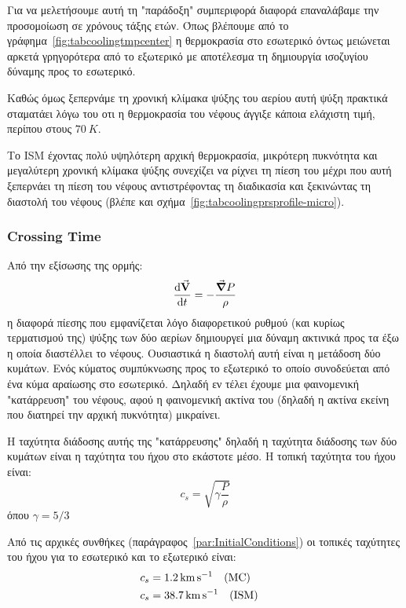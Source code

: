	Για να μελετήσουμε αυτή τη "παράδοξη" συμπεριφορά διαφορά επαναλάβαμε την προσομοίωση σε χρόνους τάξης ετών. Όπως βλέπουμε από το γράφημα~\ref{fig:tabcoolingtmpcenter} η θερμοκρασία στο εσωτερικό όντως μειώνεται αρκετά γρηγορότερα από το εξωτερικό με αποτέλεσμα τη δημιουργία ισοζυγίου δύναμης προς το εσωτερικό.
	
		Καθώς όμως ξεπερνάμε τη χρονική κλίμακα ψύξης του αερίου αυτή ψύξη πρακτικά  σταματάει λόγω του οτι η θερμοκρασία του νέφους άγγιξε κάποια ελάχιστη τιμή, περίπου στους $\SI{70}{K}$. 

 	Το ISM έχοντας πολύ υψηλότερη αρχική θερμοκρασία, μικρότερη πυκνότητα και μεγαλύτερη χρονική κλίμακα ψύξης συνεχίζει να ρίχνει τη πίεση του μέχρι που αυτή ξεπερνάει τη πίεση του νέφους αντιστρέφοντας τη διαδικασία και ξεκινώντας τη διαστολή του νέφους (βλέπε και σχήμα~\ref{fig:tabcoolingprsprofile-micro}).
	

	\subsubsection{Crossing Time}
	\label{par:crossing_time}
%	
	 Από την εξίσωσης της ορμής:
	\begin{equation}
	\dv{\va V}{t}=-\frac{\grad P}{\rho}
	\end{equation}
	η διαφορά πίεσης που εμφανίζεται λόγο διαφορετικού ρυθμού (και κυρίως τερματισμού της) ψύξης των δύο αερίων δημιουργεί μια δύναμη ακτινικά προς τα έξω η οποία διαστέλλει το νέφους. Ουσιαστικά η διαστολή αυτή είναι η μετάδοση δύο κυμάτων. Ενός κύματος συμπύκνωσης προς το εξωτερικό το οποίο συνοδεύεται από ένα κύμα αραίωσης στο εσωτερικό. Δηλαδή εν τέλει έχουμε μια φαινομενική "κατάρρευση" του νέφους, αφού η φαινομενική ακτίνα του (δηλαδή η ακτίνα εκείνη που διατηρεί την αρχική πυκνότητα) μικραίνει.
	 
	Η ταχύτητα διάδοσης αυτής της "κατάρρευσης" δηλαδή η ταχύτητα διάδοσης των δύο κυμάτων είναι η ταχύτητα του ήχου στο εκάστοτε μέσο. Η τοπική ταχύτητα του ήχου είναι:
	\begin{equation}
	c_s=\sqrt{\gamma \frac{P}{\rho}}
	\end{equation}
	όπου $\gamma = 5/3$
	
	
	Από τις αρχικές συνθήκες (παράγραφος~\ref{par:InitialConditions}) οι τοπικές ταχύτητες του ήχου για το εσωτερικό και το εξωτερικό είναι:
	\begin{align}
	c_s &=\SI{1.2}{km.s^{-1}} \qq{(MC)} \\
	c_s &=\SI{38.7}{km.s^{-1}} \qq{(ISM)}
	\end{align}
	
